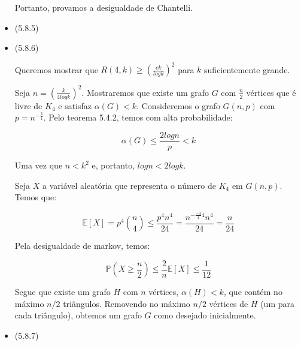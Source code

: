 \documentclass{article}
\begin{document}
\begin{itemize}
	      Portanto, provamos a desigualdade de Chantelli.


	\item (5.8.5)
	\item (5.8.6)

	      Queremos mostrar que \(R(4, k) \geq (\frac{ck}{log k})^2\) para \(k\) suficientemente grande.

	      Seja \(n = (\frac{k}{4 log k})^2\). Mostraremos que existe um grafo \(G\) com \(\frac{n}{2}\) vértices que é livre de \(K_4\) e satisfaz \(\alpha(G) < k\).
	      Consideremos o grafo \(G(n,p)\) com \(p = n^{-\frac{3}{4}}\). Pelo teorema 5.4.2, temos com alta probabilidade:

	      \[\alpha(G) \leq \frac{2 log n}{p} < k\]

	      Uma vez que \(n < k^2\) e, portanto, \(log n < 2 log k\).

	      Seja \(X\) a variável aleatória que representa o número de \(K_4\) em \(G(n, p)\). Temos que:

	      \[\mathbb{E}[X] = p^4 \binom{n}{4} \leq \frac{p^4 n^4}{24} = \frac{n^{-\frac{-3}{4} 4} n ^ 4}{24} = \frac{n}{24}\]

	      Pela desigualdade de markov, temos:

	      \[\mathbb{P}(X \geq \frac{n}{2}) \leq \frac{2}{n}\mathbb{E}[X] \leq \frac{1}{12}\]

	      Segue que existe um grafo \(H\) com \(n\) vértices, \(\alpha(H) < k\), que contém no
	      máximo \(n/2\) triângulos. Removendo no máximo \(n/2\) vértices de \(H\) (um para
	      cada triângulo), obtemos um grafo \(G\) como desejado inicialmente.

	\item (5.8.7)
\end{itemize}

\end{document}
